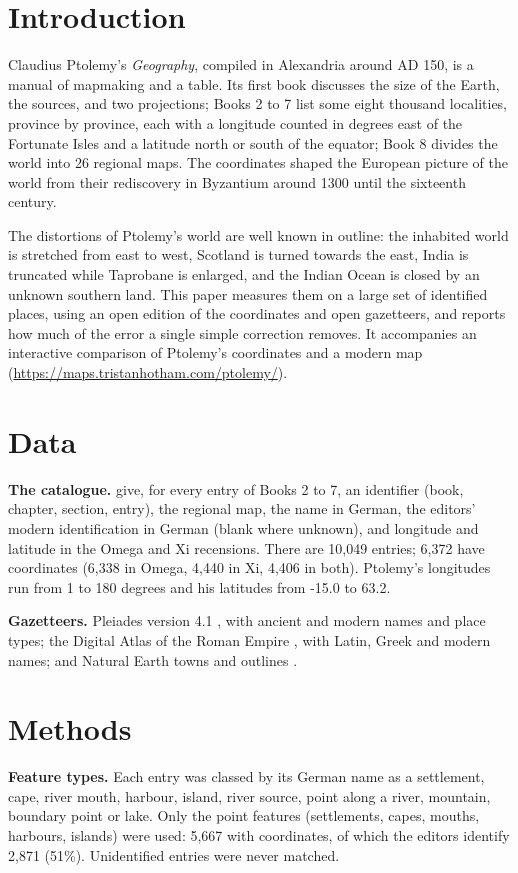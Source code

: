 \documentclass[11pt,a4paper]{article}
\begin{document}
\section{Introduction}
Claudius Ptolemy's \textit{Geography}, compiled in Alexandria around AD 150, is a manual of mapmaking and a table. Its first book discusses the size of the Earth, the sources, and two projections; Books 2 to 7 list some eight thousand localities, province by province, each with a longitude counted in degrees east of the Fortunate Isles and a latitude north or south of the equator; Book 8 divides the world into 26 regional maps. The coordinates shaped the European picture of the world from their rediscovery in Byzantium around 1300 until the sixteenth century.

The distortions of Ptolemy's world are well known in outline: the inhabited world is stretched from east to west, Scotland is turned towards the east, India is truncated while Taprobane is enlarged, and the Indian Ocean is closed by an unknown southern land. This paper measures them on a large set of identified places, using an open edition of the coordinates \citep{cat} and open gazetteers, and reports how much of the error a single simple correction removes. It accompanies an interactive comparison of Ptolemy's coordinates and a modern map (\url{https://maps.tristanhotham.com/ptolemy/}).

\section{Data}
\textbf{The catalogue.} \citet{cat} give, for every entry of Books 2 to 7, an identifier (book, chapter, section, entry), the regional map, the name in German, the editors' modern identification in German (blank where unknown), and longitude and latitude in the Omega and Xi recensions. There are 10,049 entries; 6,372 have coordinates (6,338 in Omega, 4,440 in Xi, 4,406 in both). Ptolemy's longitudes run from 1 to 180 degrees and his latitudes from -15.0 to 63.2.

\textbf{Gazetteers.} Pleiades version 4.1 \citep{pleiades}, with ancient and modern names and place types; the Digital Atlas of the Roman Empire \citep{dare}, with Latin, Greek and modern names; and Natural Earth towns and outlines \citep{naturalearth}.

\section{Methods}
\textbf{Feature types.} Each entry was classed by its German name as a settlement, cape, river mouth, harbour, island, river source, point along a river, mountain, boundary point or lake. Only the point features (settlements, capes, mouths, harbours, islands) were used: 5,667 with coordinates, of which the editors identify 2,871 (51\%). Unidentified entries were never matched.
\end{document}
